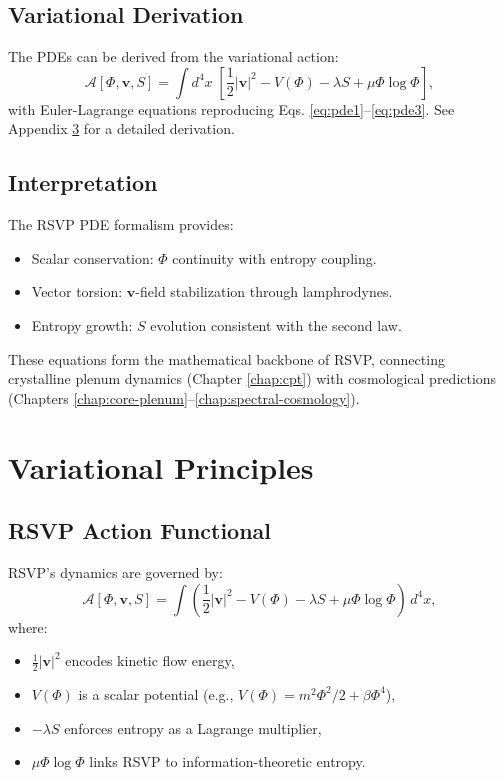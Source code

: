 \documentclass[12pt]{report}
\begin{document}
\section{Variational Derivation}
The PDEs can be derived from the variational action:
\begin{equation}
\mathcal{A}[\Phi,\mathbf{v},S] = \int d^4x \; \left[\frac{1}{2}|\mathbf{v}|^2 - V(\Phi) - \lambda S + \mu \Phi \log \Phi \right],
\end{equation}
with Euler-Lagrange equations reproducing Eqs. \eqref{eq:pde1}--\eqref{eq:pde3}. See Appendix \ref{app:V} for a detailed derivation.

\section{Interpretation}
The RSVP PDE formalism provides:
\begin{itemize}
    \item Scalar conservation: \(\Phi\) continuity with entropy coupling.
    \item Vector torsion: \(\mathbf{v}\)-field stabilization through lamphrodynes.
    \item Entropy growth: \(S\) evolution consistent with the second law.
\end{itemize}
These equations form the mathematical backbone of RSVP, connecting crystalline plenum dynamics (Chapter \ref{chap:cpt}) with cosmological predictions (Chapters \ref{chap:core-plenum}–\ref{chap:spectral-cosmology}).

\chapter{Variational Principles}
\label{app:V}
\section{RSVP Action Functional}
RSVP’s dynamics are governed by:
\begin{equation}
\mathcal{A}[\Phi,\mathbf{v},S] = \int \left( \frac{1}{2} |\mathbf{v}|^2 - V(\Phi) - \lambda S + \mu \Phi \log \Phi \right) \, d^4x, \label{eq:action}
\end{equation}
where:
\begin{itemize}
    \item \(\frac{1}{2}|\mathbf{v}|^2\) encodes kinetic flow energy,
    \item \(V(\Phi)\) is a scalar potential (e.g., \(V(\Phi) = m^2\Phi^2/2 + \beta \Phi^4\)),
    \item \(-\lambda S\) enforces entropy as a Lagrange multiplier,
    \item \(\mu \Phi \log \Phi\) links RSVP to information-theoretic entropy.
\end{itemize}
\end{document}

